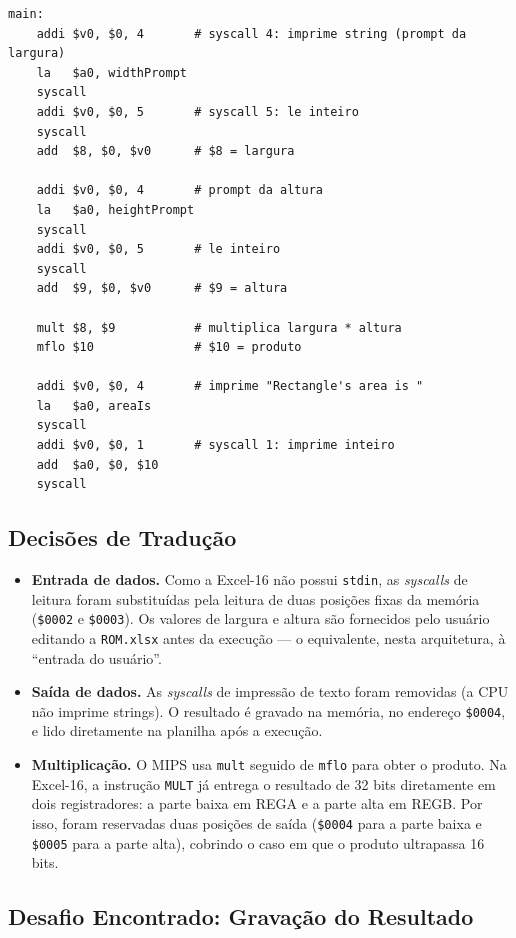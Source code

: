 \documentclass[12pt, a4paper]{article}
\begin{document}
\begin{lstlisting}[style=mips, caption={ex1.asm (trecho principal)}]
main:
    addi $v0, $0, 4       # syscall 4: imprime string (prompt da largura)
    la   $a0, widthPrompt
    syscall
    addi $v0, $0, 5       # syscall 5: le inteiro
    syscall
    add  $8, $0, $v0      # $8 = largura

    addi $v0, $0, 4       # prompt da altura
    la   $a0, heightPrompt
    syscall
    addi $v0, $0, 5       # le inteiro
    syscall
    add  $9, $0, $v0      # $9 = altura

    mult $8, $9           # multiplica largura * altura
    mflo $10              # $10 = produto

    addi $v0, $0, 4       # imprime "Rectangle's area is "
    la   $a0, areaIs
    syscall
    addi $v0, $0, 1       # syscall 1: imprime inteiro
    add  $a0, $0, $10
    syscall
\end{lstlisting}

\subsection{Decisões de Tradução}

\begin{itemize}[itemsep=4pt]
  \item \textbf{Entrada de dados.} Como a Excel-16 não possui \texttt{stdin}, as \emph{syscalls} de leitura foram substituídas pela leitura de duas posições fixas da memória (\texttt{\$0002} e \texttt{\$0003}). Os valores de largura e altura são fornecidos pelo usuário editando a \texttt{ROM.xlsx} antes da execução --- o equivalente, nesta arquitetura, à ``entrada do usuário''.
  \item \textbf{Saída de dados.} As \emph{syscalls} de impressão de texto foram removidas (a CPU não imprime strings). O resultado é gravado na memória, no endereço \texttt{\$0004}, e lido diretamente na planilha após a execução.
  \item \textbf{Multiplicação.} O MIPS usa \texttt{mult} seguido de \texttt{mflo} para obter o produto. Na Excel-16, a instrução \texttt{MULT} já entrega o resultado de 32 bits diretamente em dois registradores: a parte baixa em REGA e a parte alta em REGB. Por isso, foram reservadas duas posições de saída (\texttt{\$0004} para a parte baixa e \texttt{\$0005} para a parte alta), cobrindo o caso em que o produto ultrapassa 16 bits.
\end{itemize}

\subsection{Desafio Encontrado: Gravação do Resultado}
\end{document}
